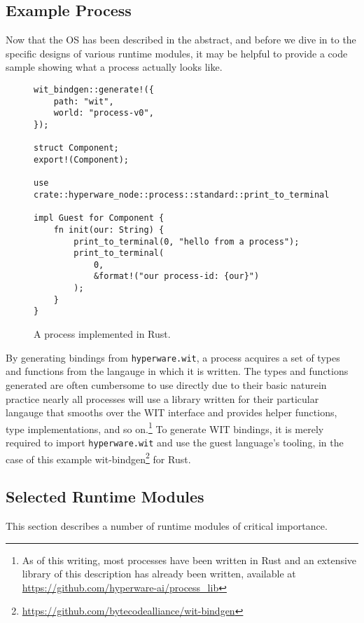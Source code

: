 \documentclass[runningheads]{llncs}
\begin{document}
\subsection{Example Process}
\label{sec:osexampleprocess}

Now that the OS has been described in the abstract, and before we dive in to the specific designs of various runtime modules, it may be helpful to provide a code sample showing what a process actually looks like.

\begin{figure}[H]
\begin{verbatim}
wit_bindgen::generate!({
    path: "wit",
    world: "process-v0",
});

struct Component;
export!(Component);

use crate::hyperware_node::process::standard::print_to_terminal;

impl Guest for Component {
    fn init(our: String) {
        print_to_terminal(0, "hello from a process");
        print_to_terminal(
            0,
            &format!("our process-id: {our}")
        );
    }
}
\end{verbatim}
    \caption{A process implemented in Rust.}
    \label{fig:example process}
\end{figure}

By generating bindings from \verb|hyperware.wit|, a process acquires a set of types and functions from the langauge in which it is written.
The types and functions generated are often cumbersome to use directly due to their basic nature\textemdash in practice nearly all processes will use a library written for their particular langauge that smooths over the WIT interface and provides helper functions, type implementations, and so on.\footnote{ As of this writing, most processes have been written in Rust and an extensive library of this description has already been written, available at \url{https://github.com/hyperware-ai/process\_lib} }
To generate WIT bindings, it is merely required to import \verb|hyperware.wit| and use the guest language's tooling, in the case of this example wit-bindgen\footnote{\url{https://github.com/bytecodealliance/wit-bindgen}} for Rust.

\subsection{Selected Runtime Modules}
\label{sec:osmodules}

This section describes a number of runtime modules of critical importance.
\end{document}
